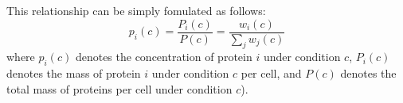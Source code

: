 \documentclass[notitlepage]{article}
\begin{document}
This relationship can be simply fomulated as follows:
\begin{equation}
  \label{eq:concentration-ratio}
  p_i(c)=\frac{P_i(c)}{P(c)}=\frac{w_i(c)}{\sum_jw_j(c)}
\end{equation}
where $p_i(c)$ denotes the concentration of protein $i$ under condition $c$, $P_i(c)$ denotes the mass of protein $i$ under condition $c$ per cell, and $P(c)$ denotes the total mass of proteins per cell under condition $c$).
\begin{comment}
\begin{figure}[h]
\centering
\texttt{[image: CoordinatedRSquareComparison.pdf]}
\caption{
  Proteins in the global cluster fit reasonably well to the global cluster itself
}
\label{fig:globalfit}
\end{figure}

\begin{figure}[h]
\centering
\texttt{[image: GlobalClusterCorr.pdf]}
\caption{
Proteins that have a high correlation (0.4-0.8) with growth rate mostly have even higher correlation to the sum of these proteins (both weighted sum and normalized sum are presented).
Weighted sum means the concentrations of all proteins in the group are summed.
Normalized sum means every protein is first normalized to have an average concentration of 1 across the different growth conditions, and then all proteins in the group are summed.
The higher correlation indicates that their response is coordinated (they scale by the same factor between conditions).
}
\label{globalcorr}
\end{figure}

\begin{figure}[h]
\centering
\texttt{[image: GlobalClusterRSquare.pdf]}
\caption{
Plotting the $r^2$ distribution shows that a large fraction of the variability of these proteins is captured by the global response.
}
\label{globalrsq}
\end{figure}

\begin{itemize}
\item This happens in multiple organisms and data sets (show yeast, two data sets of coli). Possibly add mRNA measurements ??.
\end{itemize}
\end{comment}

\printbibliography
\end{document}
